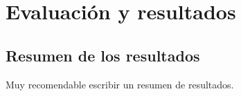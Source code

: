 \chapter{Evaluación y resultados}\label{chapter:resultados}




\section{Resumen de los resultados} \label{sect:resume_resultado}

Muy recomendable escribir un resumen de resultados.